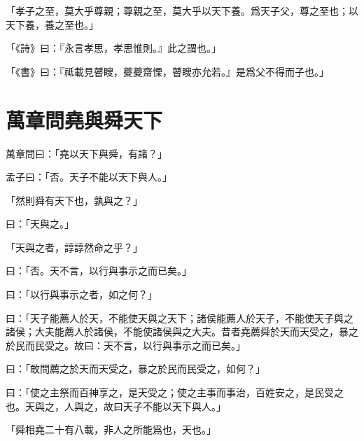 「孝子之至，莫大乎尊親；尊親之至，莫大乎以天下養。爲天子父，尊之至也；以天下養，養之至也。」

「《詩》曰：『永言孝思，孝思惟則。』此之謂也。」

「《書》曰：『祗載見瞽瞍，夔夔齋慄，瞽瞍亦允若。』是爲父不得而子也。」\par {}

\section{萬章問堯與舜天下}

萬章問曰：「堯以天下與舜，有諸？」

孟子曰：「否。天子不能以天下與人。」

「然則舜有天下也，孰與之？」

曰：「天與之。」

「天與之者，諄諄然命之乎？」

曰：「否。天不言，以行與事示之而已矣。」

曰：「以行與事示之者，如之何？」

曰：「天子能薦人於天，不能使天與之天下；諸侯能薦人於天子，不能使天子與之諸侯；大夫能薦人於諸侯，不能使諸侯與之大夫。昔者堯薦舜於天而天受之，暴之於民而民受之。故曰：天不言，以行與事示之而已矣。」

曰：「敢問薦之於天而天受之，暴之於民而民受之，如何？」

曰：「使之主祭而百神享之，是天受之；使之主事而事治，百姓安之，是民受之也。天與之，人與之，故曰天子不能以天下與人。」

「舜相堯二十有八載，非人之所能爲也，天也。」

